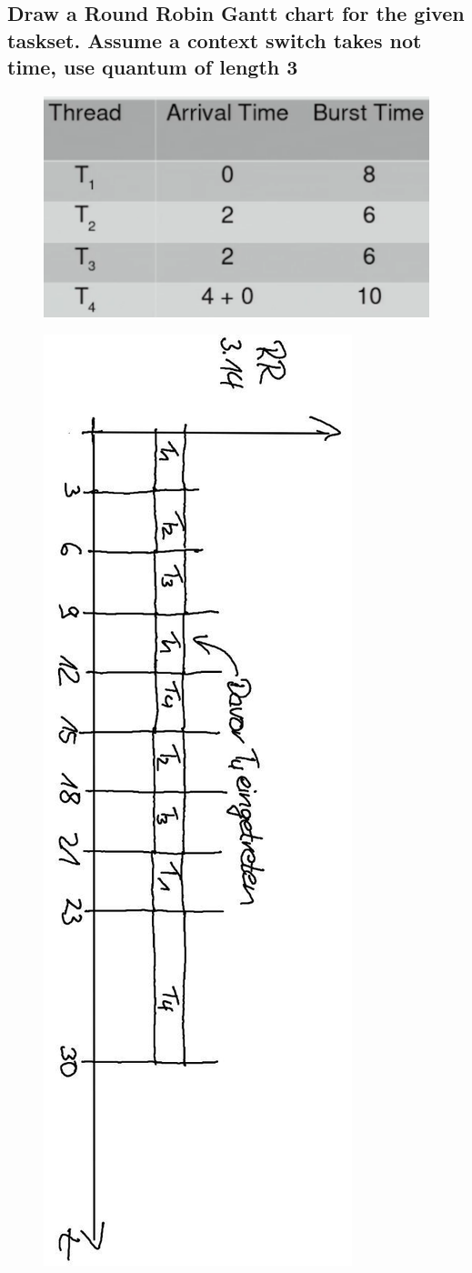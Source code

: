 \subsection{Draw a Round Robin Gantt chart for the given taskset. Assume a context switch takes not time, use quantum of length 3}
\begin{figure}[H]
	\centering
	\includegraphics[width=0.25\linewidth]{Pictures/scheduling_gantt_table_rr}
\end{figure}
\begin{figure}[H]
	\centering
	\includegraphics[width=0.25\linewidth,angle=90,origin=c]{Pictures/scheduling_gantt_dia_rr}
\end{figure}